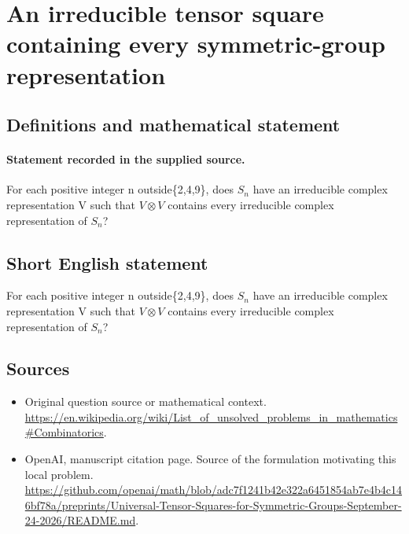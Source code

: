 \documentclass[11pt]{article}
\begin{document}
\section*{An irreducible tensor square containing every symmetric-group representation}\label{statement}
\subsection{Definitions and mathematical statement}
\paragraph{Statement recorded in the supplied source.}
For each positive integer n outside\{2,4,9\}, does $S_{n}$ have an irreducible complex representation V such that $V\otimes V$ contains every irreducible complex representation of $S_{n}$?
\subsection{Short English statement}
For each positive integer n outside\{2,4,9\}, does $S_{n}$ have an irreducible complex representation V such that $V\otimes V$ contains every irreducible complex representation of $S_{n}$?
\subsection{Sources}
\begin{itemize}
\item[S1] Original question source or mathematical context.
\url{https://en.wikipedia.org/wiki/List_of_unsolved_problems_in_mathematics#Combinatorics}.
\item[S2] OpenAI, manuscript citation page. Source of the formulation motivating this local problem.
\url{https://github.com/openai/math/blob/adc7f1241b42e322a6451854ab7e4b4c146bf78a/preprints/Universal-Tensor-Squares-for-Symmetric-Groups-September-24-2026/README.md}.
\end{itemize}
\end{document}
